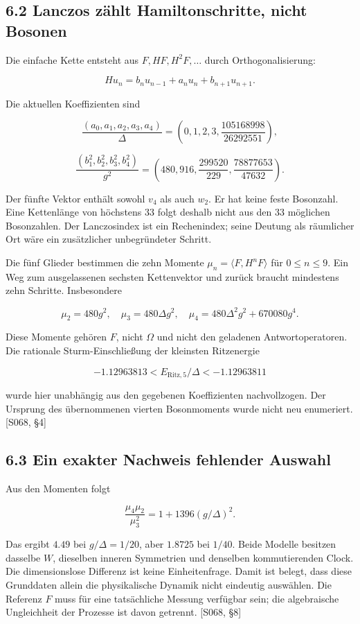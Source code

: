 \subsection{6.2 Lanczos zählt Hamiltonschritte, nicht
Bosonen}\label{lanczos-zuxe4hlt-hamiltonschritte-nicht-bosonen}

Die einfache Kette entsteht aus \(F,HF,H^2F,\ldots\) durch
Orthogonalisierung:

\[Hu_n=b_nu_{n-1}+a_nu_n+b_{n+1}u_{n+1}.\]

Die aktuellen Koeffizienten sind

\[\frac{(a_0,a_1,a_2,a_3,a_4)}\Delta
=\left(0,1,2,3,\frac{105168998}{26292551}\right),\]

\[\frac{(b_1^2,b_2^2,b_3^2,b_4^2)}{g^2}
=\left(480,916,\frac{299520}{229},\frac{78877653}{47632}\right).\]

Der fünfte Vektor enthält sowohl \(v_4\) als auch \(w_2\). Er hat keine
feste Bosonzahl. Eine Kettenlänge von höchstens 33 folgt deshalb nicht
aus den 33 möglichen Bosonzahlen. Der Lanczosindex ist ein Rechenindex;
seine Deutung als räumlicher Ort wäre ein zusätzlicher unbegründeter
Schritt.

Die fünf Glieder bestimmen die zehn Momente
\(\mu_n=\langle F,H^nF\rangle\) für \(0\le n\le9\). Ein Weg zum
ausgelassenen sechsten Kettenvektor und zurück braucht mindestens zehn
Schritte. Insbesondere

\[\mu_2=480g^2,\quad \mu_3=480\Delta g^2,\quad
\mu_4=480\Delta^2g^2+670080g^4.\]

Diese Momente gehören \(F\), nicht \(\Omega\) und nicht den geladenen
Antwortoperatoren. Die rationale Sturm-Einschließung der kleinsten
Ritzenergie

\[-1.12963813<E_{\mathrm{Ritz},5}/\Delta<-1.12963811\]

wurde hier unabhängig aus den gegebenen Koeffizienten nachvollzogen. Der
Ursprung des übernommenen vierten Bosonmoments wurde nicht neu
enumeriert. {[}S068, §4{]}

\subsection{6.3 Ein exakter Nachweis fehlender
Auswahl}\label{ein-exakter-nachweis-fehlender-auswahl}

Aus den Momenten folgt

\[\frac{\mu_4\mu_2}{\mu_3^2}=1+1396(g/\Delta)^2.\]

Das ergibt \(4.49\) bei \(g/\Delta=1/20\), aber \(1.8725\) bei \(1/40\).
Beide Modelle besitzen dasselbe \(W\), dieselben inneren Symmetrien und
denselben kommutierenden Clock. Die dimensionslose Differenz ist keine
Einheitenfrage. Damit ist belegt, dass diese Grunddaten allein die
physikalische Dynamik nicht eindeutig auswählen. Die Referenz \(F\) muss
für eine tatsächliche Messung verfügbar sein; die algebraische
Ungleichheit der Prozesse ist davon getrennt. {[}S068, §8{]}


